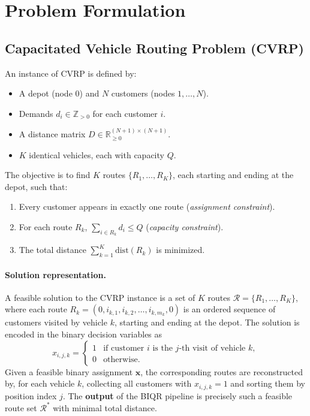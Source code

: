 \documentclass[11pt,a4paper]{article}
\theoremstyle{definition}
\begin{document}
\section{Problem Formulation}\label{sec:problem}

\subsection{Capacitated Vehicle Routing Problem (CVRP)}

An instance of CVRP is defined by:
\begin{itemize}
    \item A depot (node $0$) and $N$ customers (nodes $1, \dots, N$).
    \item Demands $d_i \in \mathbb{Z}_{>0}$ for each customer $i$.
    \item A distance matrix $D \in \mathbb{R}_{\geq 0}^{(N+1) \times (N+1)}$.
    \item $K$ identical vehicles, each with capacity $Q$.
\end{itemize}

The objective is to find $K$ routes $\{R_1, \dots, R_K\}$, each starting and ending at the depot, such that:
\begin{enumerate}
    \item Every customer appears in exactly one route (\emph{assignment constraint}).
    \item For each route $R_k$, $\sum_{i \in R_k} d_i \leq Q$ (\emph{capacity constraint}).
    \item The total distance $\sum_{k=1}^{K} \text{dist}(R_k)$ is minimized.
\end{enumerate}

\paragraph{Solution representation.} A feasible solution to the CVRP instance is a set of $K$ routes $\mathcal{R} = \{R_1, \dots, R_K\}$, where each route $R_k = (0, i_{k,1}, i_{k,2}, \dots, i_{k,m_k}, 0)$ is an ordered sequence of customers visited by vehicle $k$, starting and ending at the depot. The solution is encoded in the binary decision variables as
\begin{equation}\label{eq:solution}
    x_{i,j,k} =
    \begin{cases}
        1 & \text{if customer } i \text{ is the } j\text{-th visit of vehicle } k,\\
        0 & \text{otherwise.}
    \end{cases}
\end{equation}
Given a feasible binary assignment $\mathbf{x}$, the corresponding routes are reconstructed by, for each vehicle $k$, collecting all customers with $x_{i,j,k}=1$ and sorting them by position index $j$. The \textbf{output} of the BIQR pipeline is precisely such a feasible route set $\mathcal{R}^*$ with minimal total distance.
\end{document}
